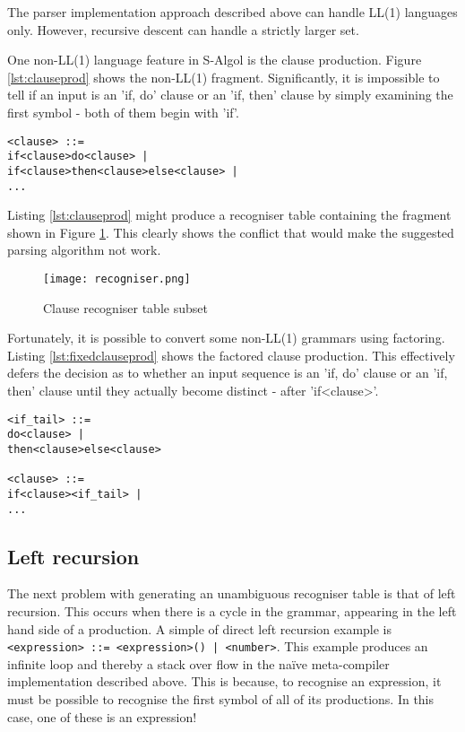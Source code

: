\documentclass{article}
\begin{document}
The parser implementation approach described above can handle LL(1) languages only. However, recursive descent can handle a strictly larger set.

One non-LL(1) language feature in S-Algol is the clause production. Figure \ref{lst:clauseprod} shows the non-LL(1) fragment. Significantly, it is impossible to tell if an input is an 'if, do' clause or an 'if, then' clause by simply examining the first symbol - both of them begin with 'if'.

\begin{lstlisting}[caption={Fragment of the <clause> production},label={lst:clauseprod}]
<clause> ::=
if<clause>do<clause> |
if<clause>then<clause>else<clause> |
...
\end{lstlisting}

Listing \ref{lst:clauseprod} might produce a recogniser table containing the fragment shown in Figure \ref{fig:incorrectrecogniserobj}. This clearly shows the conflict that would make the suggested parsing algorithm not work.

\begin{figure}[htbp]
  \centering
  \texttt{[image: recogniser.png]}
  \caption{Clause recogniser table subset}
  \label{fig:incorrectrecogniserobj}
\end{figure}

Fortunately, it is possible to convert some non-LL(1) grammars using factoring. Listing \ref{lst:fixedclauseprod} shows the factored clause production. This effectively defers the decision as to whether an input sequence is an 'if, do' clause or an 'if, then' clause until they actually become distinct - after 'if<clause>'.

\begin{lstlisting}[caption={LL(1) <clause> production},label={lst:fixedclauseprod}]
<if_tail> ::=
do<clause> |
then<clause>else<clause>

<clause> ::=
if<clause><if_tail> |
...
\end{lstlisting}

\subsection{Left recursion}

The next problem with generating an unambiguous recogniser table is that of left recursion. This occurs when there is a cycle in the grammar, appearing in the left hand side of a production. A simple of direct left recursion example is \lstinline{<expression> ::= <expression>() | <number>}. This example produces an infinite loop and thereby a stack over flow in the naïve meta-compiler implementation described above. This is because, to recognise an expression, it must be possible to recognise the first symbol of all of its productions. In this case, one of these is an expression!
\end{document}
